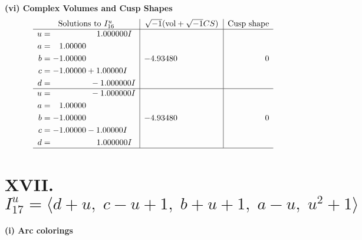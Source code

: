 \documentclass[1p]{elsarticle_modified}
\theoremstyle{definition}
\newcommand{\I}{\sqrt{-1}}
\begin{document}
\newpage\flushleft \textbf{(vi) Complex Volumes and Cusp Shapes}
$$\begin{array}{c|c|c}  
\text{Solutions to }I^u_{16}& \I (\text{vol} + \sqrt{-1}CS) & \text{Cusp shape}\\
 \hline 
\begin{aligned}
u &= \phantom{-0.000000 -}1.000000 I \\
a &= \phantom{-}1.00000\phantom{ +0.000000I} \\
b &= -1.00000\phantom{ +0.000000I} \\
c &= -1.00000 + 1.00000 I \\
d &= \phantom{-0.000000 } -1.000000 I\end{aligned}
 & -4.93480\phantom{ +0.000000I} & \phantom{-0.000000 } 0 \\ \hline\begin{aligned}
u &= \phantom{-0.000000 } -1.000000 I \\
a &= \phantom{-}1.00000\phantom{ +0.000000I} \\
b &= -1.00000\phantom{ +0.000000I} \\
c &= -1.00000 - 1.00000 I \\
d &= \phantom{-0.000000 -}1.000000 I\end{aligned}
 & -4.93480\phantom{ +0.000000I} & \phantom{-0.000000 } 0\\
 \hline 
 \end{array}$$\newpage\newpage\renewcommand{\arraystretch}{1}
\centering \section*{XVII. $I^u_{17}= \langle d+u,\;c- u+1,\;b+u+1,\;a- u,\;u^2+1 \rangle$}
\flushleft \textbf{(i) Arc colorings}\\
\end{document}
